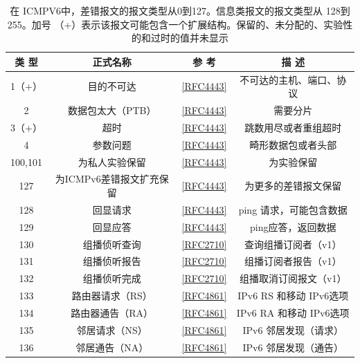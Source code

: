\begin{table}[]
    \centering
    \caption{在 ICMPV6中，差错报文的报文类型从0到127。信息类报文的报文类型从 128到255。加号
			（+）表示该报文可能包含一个扩展结构。保留的、未分配的、实验性的和过时的值并未显示}
    \begin{tabular}{c|c|c|c}
        \hline
		类 型	&	正式名称	&	参 考	&	描 述 \\ \hline
		1（+）	&	目的不可达	&	\href{https://www.rfc-editor.org/rfc/rfc4443}{[RFC4443]}	&	不可达的主机、端口、协议 \\ \hline
		2	&	数据包太大（PTB）	&	\href{https://www.rfc-editor.org/rfc/rfc4443}{[RFC4443]}	&	需要分片 \\ \hline
		3（+）	&	超时	&	\href{https://www.rfc-editor.org/rfc/rfc4443}{[RFC4443]}	&	跳数用尽或者重组超时 \\ \hline
		4	&	参数问题	&	\href{https://www.rfc-editor.org/rfc/rfc4443}{[RFC4443]}	&	畸形数据包或者头部 \\ \hline
		100,101	&	为私人实验保留	&	\href{https://www.rfc-editor.org/rfc/rfc4443}{[RFC4443]}	&	为实验保留 \\ \hline
		127	&	为ICMPv6差错报文扩充保留	&	\href{https://www.rfc-editor.org/rfc/rfc4443}{[RFC4443]}	&	为更多的差错报文保留 \\ \hline
		128	&	回显请求	&	\href{https://www.rfc-editor.org/rfc/rfc4443}{[RFC4443]}	&	ping 请求，可能包含数据 \\ \hline
		129	&	回显应答	&	\href{https://www.rfc-editor.org/rfc/rfc4443}{[RFC4443]}	&	ping应答，返回数据 \\ \hline
		130	&	组播侦听查询	&	\href{https://www.rfc-editor.org/rfc/rfc2710}{[RFC2710]}	&	查询组播订阅者（v1） \\ \hline
		131	&	组播侦听报告	&	\href{https://www.rfc-editor.org/rfc/rfc2710}{[RFC2710]}	&	组播订阅者报告（v1） \\ \hline
		132	&	组播侦听完成	&	\href{https://www.rfc-editor.org/rfc/rfc2710}{[RFC2710]}	&	组播取消订阅报文（v1） \\ \hline
		133	&	路由器请求（RS）	&	\href{https://www.rfc-editor.org/rfc/rfc4861}{[RFC4861]}	&	IPv6 RS 和移动 IPv6选项 \\ \hline
		134	&	路由器通告（RA）	&	\href{https://www.rfc-editor.org/rfc/rfc4861}{[RFC4861]}	&	IPv6 RA 和移动 IPv6选项 \\ \hline
		135	&	邻居请求（NS）	&	\href{https://www.rfc-editor.org/rfc/rfc4861}{[RFC4861]}	&	IPv6 邻居发现（请求） \\ \hline
		136	&	邻居通告（NA）	&	\href{https://www.rfc-editor.org/rfc/rfc4861}{[RFC4861]}	&	IPv6 邻居发现（通告） \\ \hline

\end{tabular}
\end{table}
